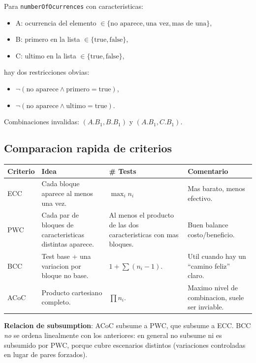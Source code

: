 \documentclass[12pt,a4paper]{article}
\begin{document}
\begin{ejemplobox}
Para \texttt{numberOfOcurrences} con caracteristicas:
\begin{itemize}
  \item A: ocurrencia del elemento \(\in \{\text{no aparece}, \text{una vez}, \text{mas de una}\}\),
  \item B: primero en la lista \(\in \{\text{true}, \text{false}\}\),
  \item C: ultimo en la lista \(\in \{\text{true}, \text{false}\}\),
\end{itemize}
hay dos restricciones obvias:
\begin{itemize}
  \item \(\neg(\text{no aparece} \wedge \text{primero} = \text{true})\),
  \item \(\neg(\text{no aparece} \wedge \text{ultimo} = \text{true})\).
\end{itemize}
Combinaciones invalidas: \((A.B_1, B.B_1)\) y \((A.B_1, C.B_1)\).
\end{ejemplobox}

\subsection{Comparacion rapida de criterios}

\begin{longtable}{@{}p{2.5cm}p{4cm}p{4cm}p{4cm}@{}}
\toprule
\textbf{Criterio} & \textbf{Idea} & \textbf{\# Tests} & \textbf{Comentario} \\
\midrule
\endhead
ECC & Cada bloque aparece al menos una vez. & \(\max_i n_i\) & Mas barato, menos efectivo. \\
PWC & Cada par de bloques de caracteristicas distintas aparece. & Al menos el producto de las dos caracteristicas con mas bloques. & Buen balance costo/beneficio. \\
BCC & Test base + una variacion por bloque no base. & \(1 + \sum (n_i - 1)\). & Util cuando hay un ``camino feliz'' claro. \\
ACoC & Producto cartesiano completo. & \(\prod n_i\). & Maximo nivel de combinacion, suele ser inviable. \\
\bottomrule
\end{longtable}

\textbf{Relacion de subsumption}: ACoC subsume a PWC, que subsume a ECC. BCC \emph{no} se ordena
linealmente con los anteriores: en general no subsume ni es subsumido por PWC, porque cubre
escenarios distintos (variaciones controladas en lugar de pares forzados).
\end{document}

